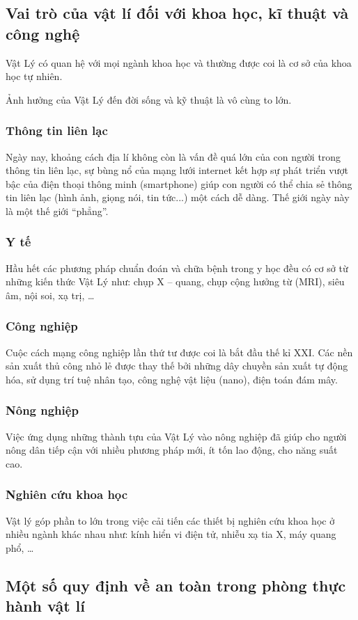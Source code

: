\subsection{Vai trò của vật lí đối với khoa học, kĩ thuật và công nghệ}
Vật Lý có quan hệ với mọi ngành khoa học và thường được coi là cơ sở của khoa học tự nhiên.

Ảnh hưởng của Vật Lý đến đời sống và kỹ thuật là vô cùng to lớn.
\subsubsection{Thông tin liên lạc}
Ngày nay, khoảng cách địa lí không còn là vấn đề quá lớn của con người trong thông tin liên lạc, sự bùng nổ của mạng lưới internet kết hợp sự phát triển vượt bậc của điện thoại thông minh (smartphone) giúp con người có thể chia sẻ thông tin liên lạc (hình ảnh, giọng nói, tin tức...) một cách dễ dàng. Thế giới ngày này là một thế giới “phẳng”.
\subsubsection{Y tế}
Hầu hết các phương pháp chuẩn đoán và chữa bệnh trong y học đều có cơ sở từ những kiến thức Vật Lý như: chụp X – quang, chụp cộng hưởng từ (MRI), siêu âm, nội soi, xạ trị, \dots
\subsubsection{Công nghiệp}
Cuộc cách mạng công nghiệp lần thứ tư được coi là bắt đầu thế kỉ XXI. Các nền sản xuất thủ công nhỏ lẻ được thay thế bởi những dây chuyền sản xuất tự động hóa, sử dụng trí tuệ nhân tạo, công nghệ vật liệu (nano), điện toán đám mây.
\subsubsection{Nông nghiệp}
Việc ứng dụng những thành tựu của Vật Lý vào nông nghiệp đã giúp cho người nông dân tiếp cận với nhiều phương pháp mới, ít tốn lao động, cho năng suất cao. 
\subsubsection{Nghiên cứu khoa học}
Vật lý góp phần to lớn trong việc cải tiến các thiết bị nghiên cứu khoa học ở nhiều ngành khác nhau như: kính hiển vi điện tử, nhiễu xạ tia X, máy quang phổ, \dots

\subsection{Một số quy định về an toàn trong phòng thực hành vật lí}
